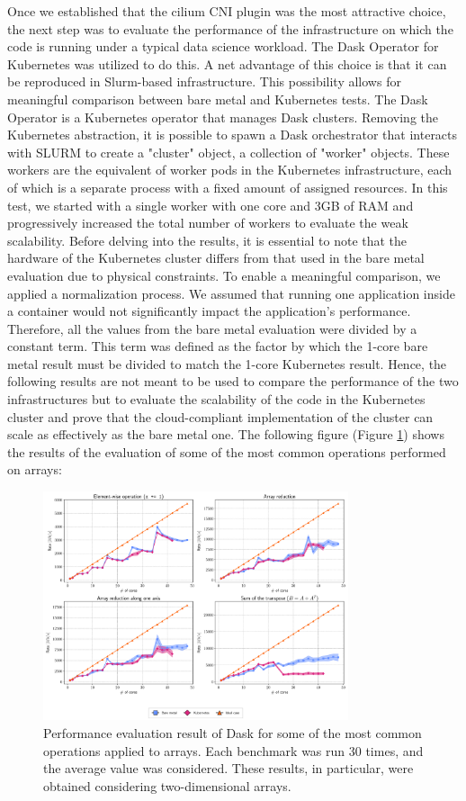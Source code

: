 Once we established that the cilium CNI plugin was the most attractive choice,
the next step was to evaluate the performance of the infrastructure on which the
code is running under a typical data science workload. The Dask Operator for
Kubernetes was utilized to do this. A net advantage of this choice is that it
can be reproduced in Slurm-based infrastructure. This possibility allows for
meaningful comparison between bare metal and Kubernetes tests. The Dask Operator
is a Kubernetes operator that manages Dask clusters. Removing the Kubernetes
abstraction, it is possible to spawn a Dask orchestrator that interacts with
SLURM to create a "cluster" object, a collection of "worker" objects. These
workers are the equivalent of worker pods in the Kubernetes infrastructure, each
of which is a separate process with a fixed amount of assigned resources. In
this test, we started with a single worker with one core and 3GB of RAM and
progressively increased the total number of workers to evaluate the weak
scalability.
Before delving into the results, it is essential to note that the hardware of
the Kubernetes cluster differs from that used in the bare metal evaluation due
to physical constraints. To enable a meaningful comparison, we applied a
normalization process. We assumed that running one application inside a
container \cite{deochake2023}   would not significantly impact the application's
performance. Therefore, all the values from the bare metal evaluation were
divided by a constant term. This term was defined as the factor by which the
1-core bare metal result must be divided to match the 1-core Kubernetes result.
Hence, the following results are not meant to be used to compare the performance
of the two infrastructures but to evaluate the scalability of the code in the
Kubernetes cluster and prove that the cloud-compliant implementation of the
cluster can scale as effectively as the bare metal one.
The following figure (Figure \ref{fig:summary-dask_en}) shows the results of the
evaluation of some of the most common operations performed on arrays:

\begin{figure}
  \centering
  \includegraphics[width=0.8\textwidth]{img/abstract/summary-dask}
  \caption{Performance evaluation result of Dask for some of the most common operations applied to arrays. Each benchmark was run 30 times, and the average value was considered. These results, in particular, were obtained considering two-dimensional arrays.}
  \label{fig:summary-dask_en}
\end{figure}

